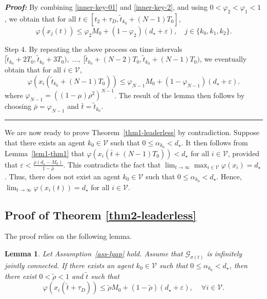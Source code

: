 \documentclass[a4paper, 11pt]{article}
\newtheorem{lemma}{Lemma}
\newenvironment{IEEEproof}[1][\bf Proof]{\smallskip\par\noindent\textit{#1: }}{\hspace*{\fill} \rule{6pt}{6pt}\smallskip}
\newcommand{\eps}{\varepsilon}
\begin{document}
\begin{IEEEproof}
By combining \eqref{inner-key-01} and \eqref{inner-key-2}, and using $0<\varphi_2<\varphi_1<1$,
we obtain that for all $t \in [t_2+\tau_D, \tilde{t}_{k_0}+(N-1)T_0]$,
\begin{equation*}\label{inner-key-012}
\varphi(x_j(t))\leq \varphi_2 M_0+(1-\varphi_2)(d_\star+\eps), \quad j \in \{k_0,k_1,k_2\}.
\end{equation*}

\vspace{2mm}

\noindent Step 4. By repeating the above process on
time intervals $[\tilde{t}_{k_0}+2T_0,\tilde{t}_{k_0}+3T_0), \; \ldots,\; [\tilde{t}_{k_0}+(N-2)T_0,\tilde{t}_{k_0}+(N-1)T_0)$,
we eventually obtain that for all $i \in \mathcal{V}$,
\begin{equation*}\label{inner-key-N}
\varphi(x_i(\tilde{t}_{k_0}+(N-1)T_0)) \leq \varphi_{N-1} M_0+(1-\varphi_{N-1})(d_\star+\eps).
\end{equation*}
where $\varphi_{N-1}=((1-\mu)\rho^2)^{N-1}$.
The result of the lemma then follows by choosing $\bar{\rho}=\varphi_{N-1}$ and $\bar{t}=\tilde{t}_{k_0}$.
\end{IEEEproof}

We are now ready to prove Theorem~\ref{thm1-leaderless} by contradiction.
Suppose that there exists an agent $k_0 \in \mathcal{V}$ such that
$0 \leq \alpha_{k_0}< d_\star$. It then follows from Lemma~\ref{lem1-thm1} that $\varphi(x_i(\bar{t}+(N-1)T_0))<d_\star$
for all $i \in \mathcal{V}$, provided that $\eps<\frac{\bar{\rho}(d_\star-M_0)}{1-\bar{\rho}}$.
This contradicts the fact that $\lim_{t \rightarrow \infty} \max_{i \in \mathcal{V}} \varphi(x_i) =d_\star$.
Thus, there does not exist an agent $k_0 \in \mathcal{V}$ such that $0 \leq \alpha_{k_0}<d_\star$. Hence, $\lim_{t \rightarrow \infty} \varphi(x_i(t)) =d_\star$ for all $i \in \mathcal{V}$.

\subsection{Proof of Theorem \ref{thm2-leaderless}}\label{proof-thm2-leaderless}
The proof relies on the following lemma.
\begin{lemma}\label{lem1-thm2}
Let Assumption~\ref{ass-lyap} hold. Assume that $\mathcal{G}_{\sigma(t)}$ is infinitely jointly connected.
If there exists an agent $k_0 \in \mathcal{V}$ such that
$0 \leq \alpha_{k_0}< d_\star$, then there exist $0<\tilde{\rho}<1$ and $\tilde{t}$ such that
\[
\varphi(x_i(\tilde{t}+\tau_D)) \leq \tilde{\rho}M_0+(1-\tilde{\rho})(d_\star+\varepsilon), \quad \, \forall i \in \mathcal{V}.
\]
\end{lemma}
\end{document}

